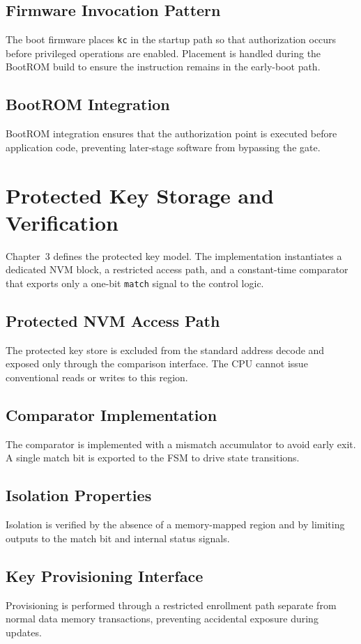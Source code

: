 \subsection{Firmware Invocation Pattern}
The boot firmware places \texttt{kc} in the startup path so that authorization occurs before
privileged operations are enabled. Placement is handled during the BootROM build to ensure the
instruction remains in the early-boot path.

\subsection{BootROM Integration}
BootROM integration ensures that the authorization point is executed before application code,
preventing later-stage software from bypassing the gate.

\section{Protected Key Storage and Verification}
Chapter~3 defines the protected key model. The implementation instantiates a dedicated NVM
block, a restricted access path, and a constant-time comparator that exports only a one-bit
\texttt{match} signal to the control logic.

\subsection{Protected NVM Access Path}
The protected key store is excluded from the standard address decode and exposed only through
the comparison interface. The CPU cannot issue conventional reads or writes to this region.

\subsection{Comparator Implementation}
The comparator is implemented with a mismatch accumulator to avoid early exit. A single match
bit is exported to the FSM to drive state transitions.

\subsection{Isolation Properties}
Isolation is verified by the absence of a memory-mapped region and by limiting outputs to the
match bit and internal status signals.

\subsection{Key Provisioning Interface}
Provisioning is performed through a restricted enrollment path separate from normal data
memory transactions, preventing accidental exposure during updates.

